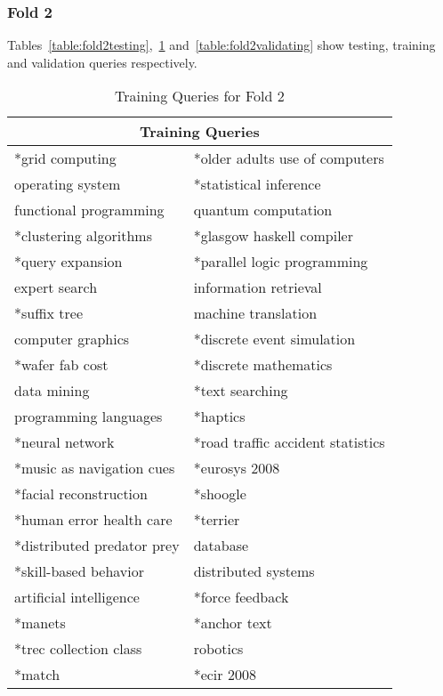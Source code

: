 \subsubsection{Fold 2}
Tables~\ref{table:fold2testing},~\ref{table:fold2training} and~\ref{table:fold2validating} show testing, training and validation queries respectively.
\begin{table}
\centering
\begin{tabular}{|l|l|}

\hline \multicolumn{2}{|c|}{\textbf{Training Queries}} \\
\hline *grid computing & *older adults use of computers \\
\hline operating system & *statistical inference \\
\hline functional programming & quantum computation \\
\hline *clustering algorithms & *glasgow haskell compiler \\ 
\hline *query expansion & *parallel logic programming \\
\hline expert search & information retrieval \\ 
\hline *suffix tree & machine translation \\
\hline computer graphics & *discrete event simulation \\ 
\hline *wafer fab cost & *discrete mathematics \\
\hline data mining & *text searching \\ 
\hline programming languages & *haptics \\
\hline *neural network & *road traffic accident statistics \\ 
\hline *music as navigation cues & *eurosys 2008 \\
\hline *facial reconstruction & *shoogle \\
\hline *human error health care & *terrier \\
\hline *distributed predator prey & database \\
\hline *skill-based behavior & distributed systems \\
\hline artificial intelligence & *force feedback \\
\hline *manets & *anchor text \\
\hline *trec collection class & robotics \\
\hline *match & *ecir 2008 \\
\hline
\end{tabular}
\caption{Training Queries for Fold 2} \label{table:fold2training}
\end{table}

